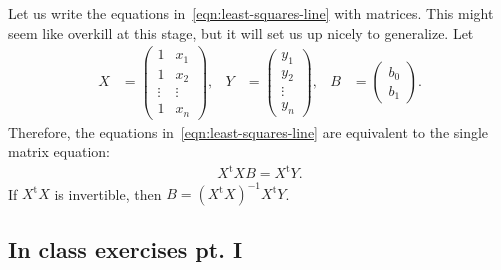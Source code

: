 \documentclass[a4paper, 12pt]{article}
\numberwithin{equation}{section}
\numberwithin{figure}{section}
\theoremstyle{definition}
\newcommand{\tr}{\mathrm{t}}
\begin{document}
Let us write the equations in~\eqref{eqn:least-squares-line} with matrices. This
might seem like overkill at this stage, but it will set us up nicely to
generalize. Let 
\begin{align}\label{eqn:X-Y-B}
	X &= \begin{pmatrix}
		1 & x_1 \\
		1 & x_2 \\
		\vdots & \vdots \\
		1 & x_n
	\end{pmatrix}, & 
	Y &= \begin{pmatrix}
		y_1 \\ y_2 \\ \vdots \\ y_n
	\end{pmatrix}, & 
	B &= \begin{pmatrix}
		b_0 \\ b_1 
	\end{pmatrix}. 
\end{align}
Therefore, the equations in~\eqref{eqn:least-squares-line} are equivalent to the
single matrix equation:
\begin{align}
	X^\tr XB = X^\tr Y.
\end{align}
If $X^{\tr} X$ is invertible, then $B = (X^{\tr}X)^{-1}X^{\tr}Y$.

\subsection{In class exercises pt. I}
\end{document}
